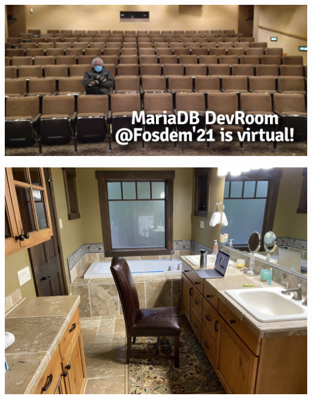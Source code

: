\documentclass[aspectratio=169]{beamer}
\begin{document}
\begin{frame}
	\begin{center}
	\vfill
		\includegraphics[scale=0.3]{images/fosdem_home_5_768.jpg}
	\vfill
	\end{center}
\end{frame}

\begin{frame}
	\begin{center}
	\vfill
		\includegraphics[scale=0.25]{images/fosdem_home_3_768.jpg}
	\vfill
	\end{center}
\end{frame}
\end{document}
